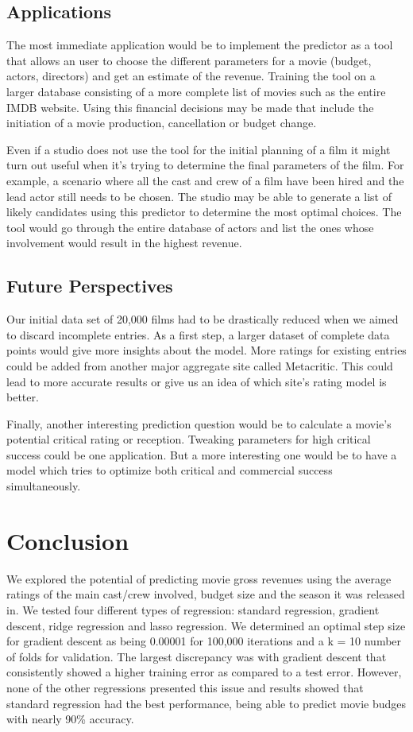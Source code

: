 \documentclass[conference]{IEEEtran}
\begin{document}
\subsection{Applications }
The most immediate application would be to implement the predictor as a tool that allows an user to choose the different parameters for a movie (budget, actors, directors) and get an estimate of the revenue. Training the tool
on a larger database consisting of a more complete list of movies such as the entire IMDB website. Using this
financial decisions may be made that include the initiation of a movie production, cancellation or budget change. 

Even if a studio does not use the tool for the initial planning of a film it might turn out useful when it's trying to determine the final parameters of the film. For example, a scenario where all the cast and crew of a film have been hired and the lead actor still needs to be chosen. The studio may be able to generate a list of likely candidates using this predictor to determine the most optimal choices. The tool would go through the entire database of actors and list the ones whose involvement would result in the highest revenue.

\subsection{Future Perspectives}
Our initial data set of 20,000 films had to be drastically reduced when we aimed to discard incomplete entries. As a first
step, a larger dataset of complete data points would give more insights about the model. More ratings for existing entries 
could be added from another major aggregate site called Metacritic. This could lead to more accurate results or give us an idea
of which site's rating model is better.

Finally, another interesting prediction question would be to calculate a movie's potential critical rating or reception. Tweaking parameters
for high critical success could be one application. But a more interesting one would be to have a model which tries to optimize both critical
and commercial success simultaneously.

\section{Conclusion}
We explored the potential of predicting movie gross revenues using the average ratings of the main
cast/crew involved, budget size and the season it was released in. We tested four different types of 
regression: standard regression, gradient descent, ridge regression and lasso regression. We determined 
an optimal step size for gradient descent as being 0.00001 for 100,000 iterations and a k = 10 number 
of folds for validation. The largest discrepancy was with gradient descent that consistently showed 
a higher training error as compared to a test error. However, none of the other regressions presented this issue and results showed that standard regression had the best performance, being able to predict movie budges with nearly 90\% accuracy.
\end{document}
